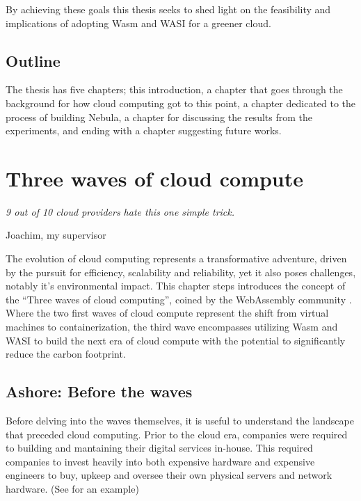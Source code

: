 \documentclass[
  table]{report}
\begin{document}
By achieving these goals this thesis seeks to shed light on the
feasibility and implications of adopting \ac{Wasm} and \ac{WASI} for a
greener cloud.

\section{Outline}

The thesis has five chapters; this introduction, a chapter that goes
through the background for how cloud computing got to this point, a
chapter dedicated to the process of building Nebula, a chapter for
discussing the results from the experiments, and ending with a chapter
suggesting future works.


\newpage

\chapter{Three waves of cloud compute}
\label{chap:three-waves}

\setlength{}

\epigraph{\itshape 
9 out of 10 cloud providers hate this one simple trick.
}{Joachim, my supervisor}

The evolution of cloud computing represents a transformative adventure,
driven by the pursuit for efficiency, scalability and reliability, yet
it also poses challenges, notably it's environmental impact. This
chapter steps introduces the concept of the ``Three waves of cloud
computing'', coined by the WebAssembly community
\citep*{butcherDodds2024, leonardWebAssemblyHeraldsThird2024}. Where the
two first waves of cloud compute represent the shift from virtual
machines to containerization, the third wave encompasses utilizing
\ac{Wasm} and \ac{WASI} to build the next era of cloud compute with the
potential to significantly reduce the carbon footprint.

\section{Ashore: Before the waves}
\label{sect:ashore}

Before delving into the waves themselves, it is useful to understand the
landscape that preceded cloud computing. Prior to the cloud era,
companies were required to building and mantaining their digital
services in-house. This required companies to invest heavily into both
expensive hardware and expensive engineers to buy, upkeep and oversee
their own physical servers and network hardware. (See 
for an example)
\end{document}
